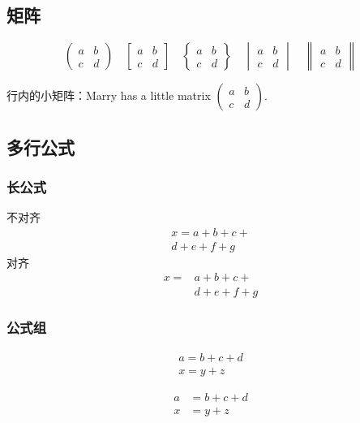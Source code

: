 \subsection{矩阵}
\[ \begin{pmatrix} a&b\\c&d \end{pmatrix} \quad
\begin{bmatrix} a&b\\c&d \end{bmatrix} \quad
\begin{Bmatrix} a&b\\c&d \end{Bmatrix} \quad
\begin{vmatrix} a&b\\c&d \end{vmatrix} \quad
\begin{Vmatrix} a&b\\c&d \end{Vmatrix} \]

行内的小矩阵：Marry has a little matrix $ ( \begin{smallmatrix} a&b\\c&d \end{smallmatrix} ) $.

\subsection{多行公式}

\subsubsection{长公式}
不对齐
\begin{multline}
x = a+b+c+{} \\
d+e+f+g
\end{multline}
对齐
\[\begin{aligned}
x ={}& a+b+c+{} \\
&d+e+f+g
\end{aligned}\]

\subsubsection{公式组}
\begin{gather}
a = b+c+d \\
x = y+z
\end{gather}

\begin{align}
a &= b+c+d \\
x &= y+z
\end{align}

